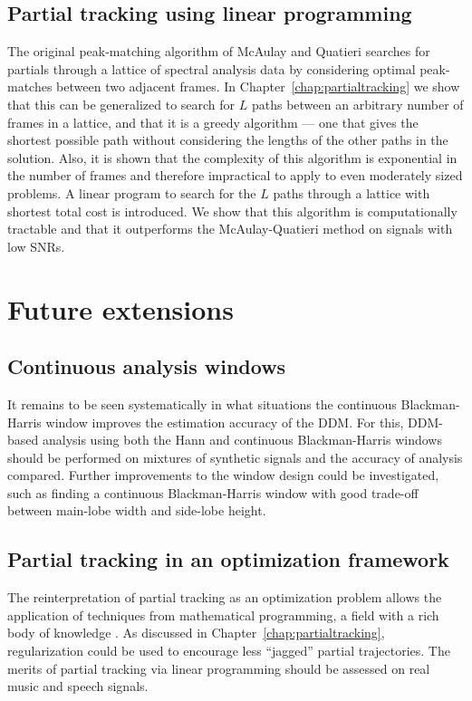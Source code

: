 \subsection{Partial tracking using linear programming}

The original peak-matching algorithm of McAulay and Quatieri
\cite{mcaulay1986speech} searches for partials through a lattice of spectral
analysis data by considering optimal peak-matches between two adjacent frames.
In Chapter~\ref{chap:partialtracking} we show that this can be generalized to
search for $L$ paths between an arbitrary number of frames in a lattice, and
that it is a greedy algorithm --- one that gives the shortest possible path
without considering the lengths of the other paths in the solution. Also, it is
shown that the complexity of this algorithm is exponential in the number of
frames and therefore impractical to apply to even moderately sized problems. A
linear program to search for the $L$ paths through a lattice with shortest total
cost is introduced. We show that this algorithm is computationally tractable and
that it outperforms the McAulay-Quatieri method on signals with low SNRs.

\section{Future extensions}

\subsection{Continuous analysis windows}

It remains to be seen systematically in what situations the continuous
Blackman-Harris window improves the estimation accuracy of the DDM. For this,
DDM-based analysis using both the Hann and continuous Blackman-Harris windows
should be performed on mixtures of synthetic signals and the accuracy of
analysis compared. Further improvements to the window design could be
investigated, such as finding a continuous Blackman-Harris window with good
trade-off between main-lobe width and side-lobe height.

\subsection{Partial tracking in an optimization framework}

The reinterpretation of partial tracking as an optimization problem allows the
application of techniques from mathematical programming, a field with
a rich body of knowledge \cite{boyd2004convex}. As discussed in
Chapter~\ref{chap:partialtracking}, regularization could be used to encourage
less ``jagged'' partial trajectories. The merits of partial tracking via
linear programming should be assessed on real music and speech signals.

